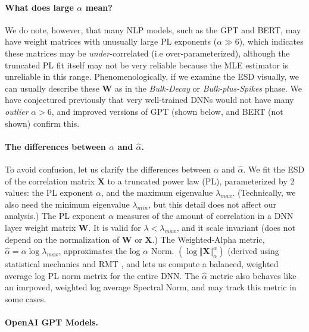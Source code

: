\paragraph{What does large $\alpha$ mean?}
We do note, however, that many NLP models, such as the GPT and BERT, may have weight matrices with unusually large PL exponents
($\alpha\gg 6$), which indicates these matrices may be \emph{under}-correlated (i.e over-parameterized), although the truncated PL fit
itself may not be very reliable because the MLE estimator is unreliable in this range.  Phenomenologically, if we examine
the ESD visually, we can usually describe these $\mathbf{W}$ as in the \emph{Bulk-Decay} or \emph{Bulk-plus-Spikes} phase\cite{MM}.
We have conjectured previously that very well-trained DNNs would not have many \emph{outlier} $\alpha>6$, 
and improved versions of GPT (shown below, and BERT (not shown) confirm this.

\paragraph{The differences between $\alpha$ and $\hat{\alpha}$.}
To avoid confusion, let us clarify the differences between $\alpha$ and $\hat{\alpha}$.  
We fit the ESD of the correlation matrix $\mathbf{X}$ to a truncated power law (PL), parameterized by 2 values:
the PL exponent $\alpha$, and the maximum eigenvalue $\lambda_{max}$.  (Technically, we also need the minimum
eigenvalue $\lambda_{min}$, but this detail does not affect our analysis.)
The PL exponent $\alpha$ measures of the 
amount of correlation in a DNN layer weight matrix $\mathbf{W}$.  It is valid for $\lambda<\lambda_{max}$, and
it scale invariant (does not depend on the normalization of $\mathbf{W}$ or $\mathbf{X}$.)
The Weighted-Alpha metric, $\hat{\alpha}=\alpha\log\lambda_{max}$, approximates the log $\alpha$ Norm.
$(\log\Vert\mathbf{X}\Vert^{\alpha}_{\alpha})$ (derived using statistical mechanics and RMT , 
and lets us compute a balanced, weighted average log PL norm metrix for the entire DNN.  
The $\hat{\alpha}$ metric also behaves like an imrpoved, weighted log average Spectral Norm, and may track this metric in some cases.

\paragraph{OpenAI GPT Models.}

